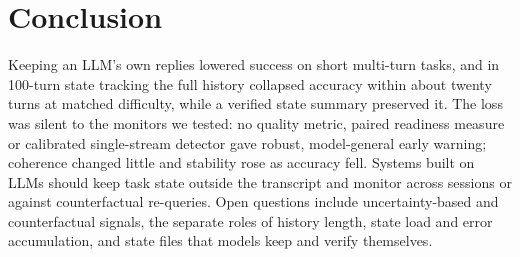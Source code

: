 \section{Conclusion}
\label{sec:conclusion}

Keeping an LLM's own replies lowered success on short multi-turn tasks, and in
100-turn state tracking the full history collapsed accuracy within about twenty
turns at matched difficulty, while a verified state summary preserved it. The
loss was silent to the monitors we tested: no quality metric, paired readiness
measure or calibrated single-stream detector gave robust, model-general early
warning; coherence changed little and stability rose as accuracy fell.
Systems built on LLMs should keep task state outside the transcript and monitor
across sessions or against counterfactual re-queries. Open questions include
uncertainty-based and counterfactual signals, the separate roles of history
length, state load and error accumulation, and state files that models keep
and verify themselves.
